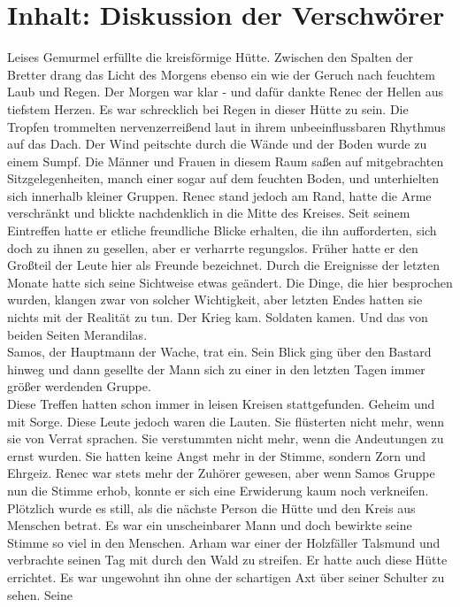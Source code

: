 \chapter{Inhalt: Diskussion der Verschwörer}

Leises Gemurmel erfüllte die kreisförmige Hütte. Zwischen den Spalten der Bretter drang das Licht 
des Morgens ebenso ein wie der Geruch nach feuchtem Laub und Regen. Der Morgen war klar - und dafür 
dankte Renec der Hellen aus tiefstem Herzen. Es war schrecklich bei Regen in dieser Hütte zu sein. 
Die Tropfen trommelten nervenzerreißend laut in ihrem unbeeinflussbaren Rhythmus auf das Dach. Der 
Wind peitschte durch die Wände und der Boden wurde zu einem Sumpf. Die Männer und Frauen in diesem 
Raum saßen auf mitgebrachten Sitzgelegenheiten, manch einer sogar auf dem feuchten Boden, und 
unterhielten sich innerhalb kleiner Gruppen. Renec stand jedoch am Rand, hatte die Arme verschränkt 
und blickte nachdenklich in die Mitte des Kreises. Seit seinem Eintreffen hatte er etliche 
freundliche Blicke erhalten, die ihn aufforderten, sich doch zu ihnen zu gesellen, aber er 
verharrte regungslos. Früher hatte er den Großteil der Leute hier als Freunde bezeichnet. Durch die 
Ereignisse der letzten Monate hatte sich seine Sichtweise etwas geändert. Die Dinge, die hier 
besprochen wurden, klangen zwar von solcher Wichtigkeit, aber letzten Endes hatten sie nichts mit 
der Realität zu tun. Der Krieg kam. Soldaten kamen. Und das von beiden Seiten Merandilas.\\
Samos, der Hauptmann der Wache, trat ein. Sein Blick ging über den Bastard hinweg und dann gesellte 
der Mann sich zu einer in den letzten Tagen immer größer werdenden Gruppe.\\
Diese Treffen hatten schon immer in leisen Kreisen stattgefunden. Geheim und mit Sorge. Diese Leute 
jedoch waren die Lauten. Sie flüsterten nicht mehr, wenn sie von Verrat sprachen. Sie verstummten 
nicht mehr, wenn die Andeutungen zu ernst wurden. Sie hatten keine Angst mehr in der Stimme, sondern 
Zorn und Ehrgeiz. Renec war stets mehr der Zuhörer gewesen, aber wenn Samos Gruppe nun die Stimme 
erhob, konnte er sich eine Erwiderung kaum noch verkneifen.\\
Plötzlich wurde es still, als die nächste Person die Hütte und den Kreis aus Menschen betrat. Es war 
ein unscheinbarer Mann und doch bewirkte seine Stimme so viel in den Menschen. Arham war einer der 
Holzfäller Talsmund und verbrachte seinen Tag mit durch den Wald zu streifen. Er hatte auch diese 
Hütte errichtet. Es war ungewohnt ihn ohne der schartigen Axt über seiner Schulter zu sehen. Seine 
